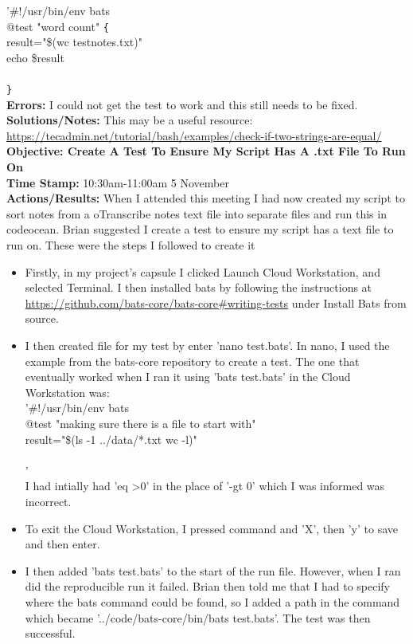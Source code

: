 \documentclass{article}
\begin{document}
\begin{FlushLeft}
'\#!/usr/bin/env bats\\
@test "word count" \verb|{|\\
result="\$(wc test\textunderscore notes.txt)"\\
echo \$result\\
[ "\$result" eq 17 test\textunderscore notes.txt" ]\\
\verb|}|\\
\textbf{Errors:} I could not get the test to work and this still needs to be fixed.\\
\textbf{Solutions/Notes:} This may be a useful resource: \url{https://tecadmin.net/tutorial/bash/examples/check-if-two-strings-are-equal/}\\
\vspace{5mm}
\textbf{Objective: Create A Test To Ensure My Script Has A .txt File To Run On}\\
\textbf{Time Stamp:} 10:30am-11:00am 5 November\\
\textbf{Actions/Results:} When I attended this meeting I had now created my script to sort notes from a oTranscribe notes text file into separate files and run this in codeocean. Brian suggested I create a test to ensure my script has a text file to run on. These were the steps I followed to create it
\begin{itemize}
    \item Firstly, in my project's capsule I clicked Launch Cloud Workstation, and selected Terminal. I then installed bats by following the instructions at \url{https://github.com/bats-core/bats-core#writing-tests} under Install Bats from source.
    \item I then created file for my test by enter 'nano test.bats'. In nano, I used the example from the bats-core repository to create a test. The one that eventually worked when I ran it using 'bats test.bats' in the Cloud Workstation was:\\
    '#!/usr/bin/env bats\\
    @test "making sure there is a file to start with" {\\
    result="\$(ls -1 ../data/*.txt \textbar{} wc -l)"\\
  [ "\$result" -gt 0 ]\\
  }'\\
  I had intially had 'eq \textgreater{}0' in the place of '-gt 0' which I was informed was incorrect.
  \item To exit the Cloud Workstation, I pressed command and 'X', then 'y' to save and then enter.
  \item I then added 'bats test.bats' to the start of the run file. However, when I ran did the reproducible run it failed. Brian then told me that I had to specify where the bats command could be found, so I added a path in the command which became '../code/bats-core/bin/bats test.bats'. The test was then successful.

\end{itemize}
\end{FlushLeft}
\end{document}
